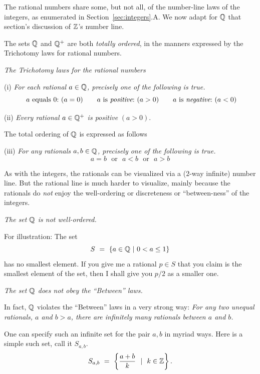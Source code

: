 The rational numbers share some, but not all, of the number-line laws
of the integers, as enumerated in Section~\ref{sec:integers}.A.
We now adapt for $\mathbb{Q}$ that section's discussion of $\mathbb{Z}$'s number line.


The sets $\mathbb{Q}$ and $\mathbb{Q}^+$ are both {\em totally ordered}, in the manners
expressed by the Trichotomy laws for rational numbers.
\medskip

\noindent
{\it The Trichotomy laws for the rational numbers}

\noindent (i)
%
{\it For each rational $a \in \mathbb{Q}$, precisely one of the following is true.}
\[
\mbox{ $a$ equals $0$:} \ (a=0) \ \ \ \
\ \mbox{ $a$ is {\em positive}:} \ (a>0) \ \ \ \
 \ \mbox{ $a$ is {\em negative}:} \ (a<0)
\]

\noindent (ii)
{\it Every rational $a \in \mathbb{Q}^+$ is positive} $(a>0)$.
\medskip

\noindent
The total ordering of $\mathbb{Q}$ is expressed as follows 

\noindent (iii)
{\it For any rationals $a, b \in \mathbb{Q}$, precisely one of the following
  is                               
  true.}
\[  a=b \ \ \ \mbox{or} \ \ \  a<b \ \ \ \mbox{or} \ \ \ a>b \]
\smallskip

As with the integers, the rationals can be visualized via a ($2$-way
infinite) number line.  But the rational line is much harder to
visualize, mainly because the rationals do {\em not} enjoy the
well-ordering or discreteness or ``between-ness'' of the integers.
\medskip

\noindent
{\em The set $\mathbb{Q}$ is {\em not} well-ordered.}

For illustration:  The set
\[ S \ = \ \{ a \in \mathbb{Q}  \ |\ 0 < a \leq 1 \} \]
has no smallest element.  If you give me a rational $p \in S$ that you
claim is the smallest element of the set, then I shall give you $p/2$
as a smaller one.
\medskip

\noindent
{\em The set $\mathbb{Q}$ does {\em not} obey the ``Between'' laws.}

In fact, $\mathbb{Q}$ violates the ``Between'' laws in a very strong way:
{\it For any two unequal rationals, $a$ and $b>a$, there are
  infinitely many rationals between $a$ and $b$.}

One can specify such an infinite set for the pair $a,b$ in myriad
ways.  Here is a simple such set, call it $S_{a,b}$.
\begin{equation}
\label{eq:between-rationals}
S_{a,b} \ = \ \left\{ \frac{a+b}{k} \ \ | \ \ k \in \mathbb{Z} \right\}.
\end{equation}

